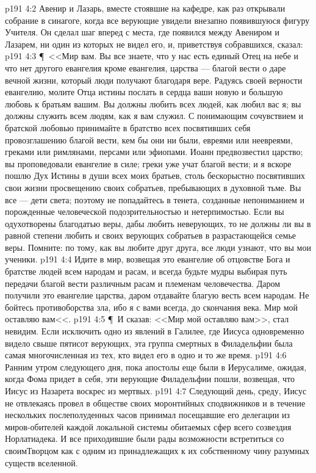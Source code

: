 \vs p191 4:2 Авенир и Лазарь, вместе стоявшие на кафедре, как раз открывали собрание в синагоге, когда все верующие увидели внезапно появившуюся фигуру Учителя. Он сделал шаг вперед с места, где появился между Авениром и Лазарем, ни один из которых не видел его, и, приветствуя собравшихся, сказал:
\vs p191 4:3 \P\ <<Мир вам. Вы все знаете, что у нас есть единый Отец на небе и что нет другого евангелия кроме евангелия, царства --- благой вести о даре вечной жизни, который люди получают благодаря вере. Радуясь своей верности евангелию, молите Отца истины послать в сердца ваши новую и большую любовь к братьям вашим. Вы должны любить всех людей, как любил вас я; вы должны служить всем людям, как я вам служил. С понимающим сочувствием и братской любовью принимайте в братство всех посвятивших себя провозглашению благой вести, кем бы они ни были, евреями или неевреями, греками или римлянами, персами или эфиопами. Иоанн предвозвестил царство; вы проповедовали евангелие в силе; греки уже учат благой вести; и я вскоре пошлю Дух Истины в души всех моих братьев, столь бескорыстно посвятивших свои жизни просвещению своих собратьев, пребывающих в духовной тьме. Вы все --- дети света; поэтому не попадайтесь в тенета, созданные непониманием и порожденные человеческой подозрительностью и нетерпимостью. Если вы одухотворены благодатью веры, дабы любить неверующих, то не должны ли вы в равной степени любить и своих верующих собратьев в разрастающейся семье веры. Помните: по тому, как вы любите друг друга, все люди узнают, что вы мои ученики.
\vs p191 4:4 Идите в мир, возвещая это евангелие об отцовстве Бога и братстве людей всем народам и расам, и всегда будьте мудры выбирая путь передачи благой вести различным расам и племенам человечества. Даром получили это евангелие царства, даром отдавайте благую весть всем народам. Не бойтесь противоборства зла, ибо я с вами всегда, до скончания века. Мир мой оставляю вам<<.
\vs p191 4:5 \P\ И сказав: <<Мир мой оставляю вам>>, стал невидим. Если исключить одно из явлений в Галилее, где Иисуса одновременно видело свыше пятисот верующих, эта группа смертных в Филадельфии была самая многочисленная из тех, кто видел его в одно и то же время.
\vs p191 4:6 Ранним утром следующего дня, пока апостолы еще были в Иерусалиме, ожидая, когда Фома придет в себя, эти верующие Филадельфии пошли, возвещая, что Иисус из Назарета воскрес из мертвых.
\vs p191 4:7 Следующий день, среду, Иисус не отвлекаясь провел в обществе своих моронтийных сподвижников и в течение нескольких послеполуденных часов принимал посещавшие его делегации из миров\hyp{}обителей каждой локальной системы обитаемых сфер всего созвездия Норлатиадека. И все приходившие были рады возможности встретиться со своимТворцом как с одним из принадлежащих к их собственному чину разумных существ вселенной.
